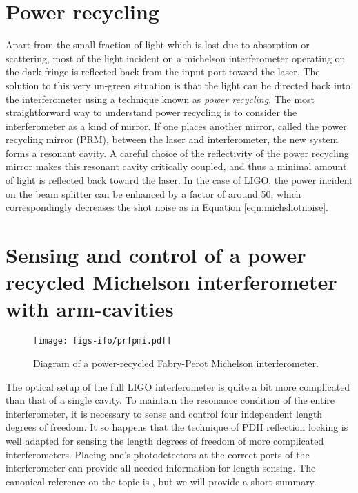 \section{Power recycling}
Apart from the small fraction of light which is lost due to absorption or scattering, most of the light incident on a michelson interferometer operating on the dark fringe is reflected back from the input port toward the laser. %
The solution to this very un-green situation is that the light can be directed back into the interferometer using a technique known as \emph{power recycling}. %
The most straightforward way to understand power recycling is to consider the interferometer as a kind of mirror. %
If one places another mirror, called the power recycling mirror (PRM), between the laser and interferometer, the new system forms a resonant cavity. %
A careful choice of the reflectivity of the power recycling mirror makes this resonant cavity critically coupled, and thus a minimal amount of light is reflected back toward the laser. %
In the case of LIGO, the power incident on the beam splitter can be enhanced by a factor of around 50, which correspondingly decreases the shot noise as in Equation \ref{eqn:michshotnoise}. %


\section{Sensing and control of a power recycled Michelson interferometer with arm-cavities}
\begin{figure}
  \begin{center}
  \leavevmode
  \texttt{[image: figs-ifo/prfpmi.pdf]}
  \end{center}
  \caption[Diagram of a power-recycled Fabry-Perot Michelson interferometer.]{Diagram of a power-recycled Fabry-Perot Michelson interferometer. }
  \label{fig:prfpmi}
\end{figure}
The optical setup of the full LIGO interferometer is quite a bit more complicated than that of a single cavity. %
To maintain the resonance condition of the entire interferometer, it is necessary to sense and control four independent length degrees of freedom. %
It so happens that the technique of PDH reflection locking is well adapted for sensing the length degrees of freedom of more complicated interferometers. %
Placing one's photodetectors at the correct ports of the interferometer can provide all needed information for length sensing. %
The canonical reference on the topic is \citet{Fritschel:01}, but we will provide a short summary.

